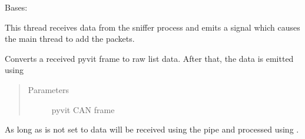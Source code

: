 \documentclass[letterpaper,10pt,english]{sphinxmanual}
\begin{document}
\begin{fulllineitems}
\label{\detokenize{src:src.FilterTab.DataAdderThread}}
Bases: 

This thread receives data from the sniffer process and
emits a signal which causes the main thread to add the packets.

\begin{fulllineitems}
\label{\detokenize{src:src.FilterTab.DataAdderThread.__init__}}
\end{fulllineitems}


\begin{fulllineitems}
\label{\detokenize{src:src.FilterTab.DataAdderThread.frameToList}}
Converts a received pyvit frame to raw list data.
After that, the data is emitted using 
\begin{quote}\begin{description}
\item[{Parameters}] \leavevmode
{} \textendash{} pyvit CAN frame

\end{description}\end{quote}

\end{fulllineitems}


\begin{fulllineitems}
\label{\detokenize{src:src.FilterTab.DataAdderThread.run}}
As long as  is not set to  data will be
received using the pipe and processed using {\hyperref[\detokenize{src:src.FilterTab.DataAdderThread.frameToList}]{}}.

\end{fulllineitems}


\end{fulllineitems}
\end{document}
